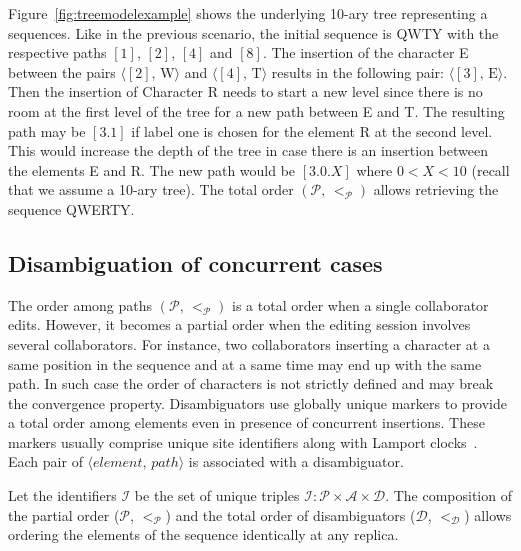 Figure~\ref{fig:treemodelexample} shows the underlying 10-ary tree representing
a sequences. Like in the previous scenario, the initial sequence is QWTY with
the respective paths $[1]$, $[2]$, $[4]$ and $[8]$. The insertion of the
character E between the pairs $\langle [2],\, \text{W}\rangle$ and
$\langle [4],\, \text{T}\rangle$ results in the following pair:
$\langle [3],\, \text{E} \rangle$. Then the insertion of Character R needs to
start a new level since there is no room at the first level of the tree for a
new path between E and T. The resulting path may be $[3.1]$ if label one is
chosen for the element R at the second level. This would increase the depth of
the tree in case there is an insertion between the elements E and R. The new
path would be $[3.0.X]$ where $0<X<10$ (recall that we assume a 10-ary
tree). The total order $(\mathcal{P},\,<_\mathcal{P})$ allows retrieving the
sequence QWERTY.

\subsection{Disambiguation of concurrent cases}
\label{subsec:disambiguation}

The order among paths $(\mathcal{P},\,<_\mathcal{P})$ is a total order when a
single collaborator edits. However, it becomes a partial order when the editing
session involves several collaborators. For instance, two collaborators
inserting a character at a same position in the sequence and at a same time may
end up with the same path. In such case the order of characters is not strictly
defined and may break the convergence property. Disambiguators use globally
unique markers to provide a total order among elements even in presence of
concurrent insertions. These markers usually comprise unique site identifiers
along with Lamport clocks~\cite{lamport1978time}. Each pair of
$\langle element,\,path\rangle$ is associated with a disambiguator.

Let the identifiers $\mathcal{I}$ be the set of unique triples
$\mathcal{I}:\mathcal{P}\times \mathcal{A}\times \mathcal{D}$. The composition
of the partial order ($\mathcal{P}$, $<_{\mathcal{P}}$) and the total order of
disambiguators ($\mathcal{D}$, $<_{\mathcal{D}}$) allows ordering the elements
of the sequence identically at any replica.

